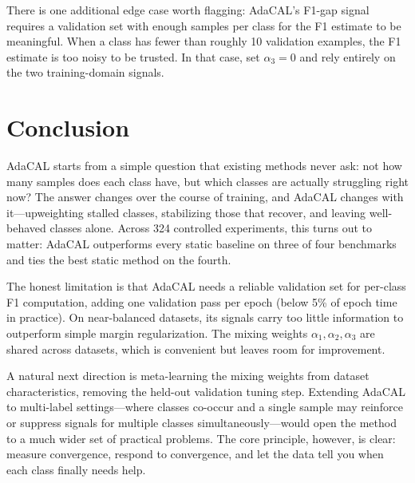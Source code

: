 \documentclass[letterpaper]{article}
\begin{document}
There is one additional edge case worth flagging: AdaCAL's F1-gap signal requires a validation set with enough samples per class for the F1 estimate to be meaningful. When a class has fewer than roughly 10 validation examples, the F1 estimate is too noisy to be trusted. In that case, set $\alpha_3 = 0$ and rely entirely on the two training-domain signals.

\section{Conclusion}

AdaCAL starts from a simple question that existing methods never ask: not how many samples does each class have, but which classes are actually struggling right now? The answer changes over the course of training, and AdaCAL changes with it---upweighting stalled classes, stabilizing those that recover, and leaving well-behaved classes alone. Across 324 controlled experiments, this turns out to matter: AdaCAL outperforms every static baseline on three of four benchmarks and ties the best static method on the fourth.

The honest limitation is that AdaCAL needs a reliable validation set for per-class F1 computation, adding one validation pass per epoch (below 5\% of epoch time in practice). On near-balanced datasets, its signals carry too little information to outperform simple margin regularization. The mixing weights $\alpha_1, \alpha_2, \alpha_3$ are shared across datasets, which is convenient but leaves room for improvement.

A natural next direction is meta-learning the mixing weights from dataset characteristics, removing the held-out validation tuning step. Extending AdaCAL to multi-label settings---where classes co-occur and a single sample may reinforce or suppress signals for multiple classes simultaneously---would open the method to a much wider set of practical problems. The core principle, however, is clear: measure convergence, respond to convergence, and let the data tell you when each class finally needs help.


\end{document}
